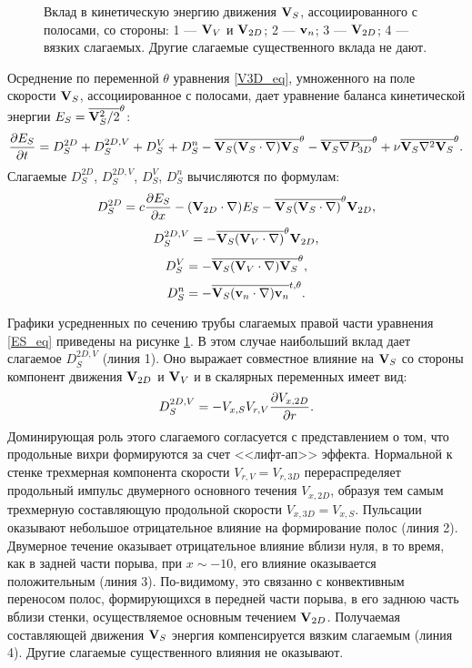 \begin{figure}
\caption{Вклад в кинетическую энергию движения $\mathbf{V}_S$, ассоциированного с полосами, со стороны: 1 --- $\mathbf{V}_V$ и $\mathbf{V}_{2D}$; 2 --- $\mathbf{v}_n$; 3 --- $\mathbf{V}_{2D}$; 4 --- вязких слагаемых. Другие слагаемые существенного вклада не дают.}
\label{es_parts_pic}
\end{figure}

Осреднение по переменной $\theta$ уравнения \eqref{V3D_eq}, умноженного на поле скорости $\mathbf{V}_S$,  ассоциированное с полосами, дает уравнение баланса кинетической энергии $E_S = \overline{\mathbf{V}_S^2/2}^\theta$:
\begin{equation}\label{ES_eq}
\frac{\partial E_S}{\partial t} = D_S^{2D} + D_S^{2D,V} + D_S^V + D_S^n - \overline{\mathbf{V}_S (\mathbf{V}_S \cdot \nabla) \mathbf{V}_S}^\theta - \overline{\mathbf{V}_S \nabla P_{3D}}^\theta + \nu \overline{\mathbf{V}_S \nabla^2 \mathbf{V}_S}^\theta.
\end{equation} 
Слагаемые $D_S^{2D}$, $D_S^{2D,V}$, $D_S^V$, $D_S^n$ вычисляются по формулам:
$$
D_S^{2D} = c \frac{\partial E_S}{\partial x} - (\mathbf{V}_{2D} \cdot \nabla) E_S - \overline{\mathbf{V}_S (\mathbf{V}_S \cdot \nabla)}^\theta \mathbf{V}_{2D},
$$
$$
D_S^{2D,V} = - \overline{\mathbf{V}_S (\mathbf{V}_V \cdot \nabla)}^\theta \mathbf{V}_{2D},
$$
$$
D_S^{V} = - \overline{\mathbf{V}_S (\mathbf{V}_V \cdot \nabla) \mathbf{V}_S}^\theta,
$$
$$
D_S^n = - \overline{\mathbf{V}_S (\mathbf{v}_n \cdot \nabla) \mathbf{v}_n}^{t,\theta}.
$$

Графики усредненных по сечению трубы слагаемых правой части уравнения \eqref{ES_eq} приведены на рисунке \ref{es_parts_pic}. В этом случае наибольший вклад дает слагаемое $D_S^{2D,V}$ (линия 1). Оно выражает совместное влияние на $\mathbf{V}_S$ со стороны компонент движения $\mathbf{V}_{2D}$ и $\mathbf{V}_V$ и в скалярных переменных имеет вид:
$$
D_S^{2D,V} =  - V_{x, S} V_{r, V} \frac{\partial V_{x, 2D}}{\partial r}.
$$
Доминирующая роль этого слагаемого согласуется с представлением о том, что продольные вихри формируются за счет <<лифт-ап>> эффекта. Нормальной к стенке трехмерная компонента скорости $V_{r,V} = V_{r,3D}$ перераспределяет продольный импульс двумерного основного течения $V_{x, 2D}$, образуя тем самым трехмерную составляющую продольной скорости $V_{x,3D} = V_{x,S}$. Пульсации оказывают небольшое отрицательное влияние на формирование полос (линия 2). Двумерное течение оказывает отрицательное влияние вблизи нуля, в то время, как в задней части порыва, при $x \sim -10$, его влияние оказывается положительным (линия 3). По-видимому, это связанно с конвективным переносом полос, формирующихся в передней части порыва, в его заднюю часть вблизи стенки, осуществляемое основным течением $\mathbf{V}_{2D}$. Получаемая составляющей движения $\mathbf{V}_S$ энергия компенсируется вязким слагаемым (линия 4). Другие слагаемые существенного влияния не оказывают. 

